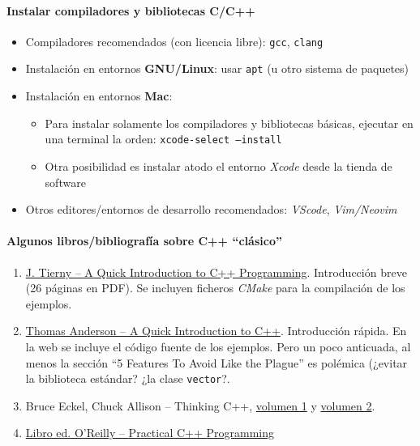 \paragraph{Instalar compiladores y bibliotecas C/C++}
\begin{itemize}
  \item Compiladores recomendados (con licencia libre): \texttt{gcc},  \texttt{clang}
  \item Instalación en entornos \textbf{GNU/Linux}: usar \texttt{apt} (u otro sistema de paquetes)
  \item Instalación en entornos \textbf{Mac}: 
    \begin{itemize}
      \item Para instalar solamente los compiladores y bibliotecas básicas, ejecutar en una terminal la orden: 
        \texttt{xcode-select --install}
      \item Otra posibilidad es instalar atodo el entorno \textit{Xcode} desde la tienda de software
    \end{itemize}
  \item Otros editores/entornos de desarrollo recomendados: \textit{VScode}, \textit{Vim/Neovim} 
\end{itemize}
\paragraph{Algunos libros/bibliografía sobre C++ ``clásico''}
\begin{enumerate}

  \item \href{http://www-apr.lip6.fr/~tierny/stuff/teaching/tierny_visualization_introductionC++.pdf}{J. Tierny -- A Quick Introduction to C++ Programming}. Introducción breve (26 páginas en PDF). Se incluyen ficheros \textit{CMake} para la compilación de los ejemplos.
  \item \href{https://homes.cs.washington.edu/~tom/c++example/}{Thomas Anderson -- A Quick Introduction to C++}. Introducción rápida. En la web se incluye el código fuente de los ejemplos. Pero un poco anticuada, al menos la sección ``5 Features To Avoid Like the Plague'' es polémica (¿evitar la biblioteca estándar? ¿la clase \texttt{vector}?.
  \item Bruce Eckel, Chuck Allison -- Thinking C++, \href{http://vergil.chemistry.gatech.edu/resources/programming/pdf/TIC2Vone.pdf}{volumen 1} y \href{https://www.cs.rit.edu/~cs4/Thinking-in-C++2nd-ed-Volume-2.pdf}{volumen 2}.
\item \href{https://github.com/manish-old/ebooks-2/blob/master/O'Reilly\%20-\%20Practical\%20C\%2B\%2B\%20Programming.pdf}
{Libro ed. O'Reilly -- Practical C++ Programming}
\end{enumerate}

